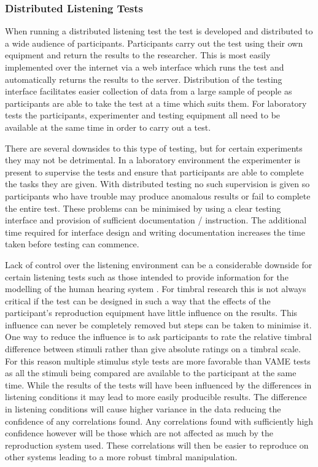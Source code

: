 		\subsubsection*{Distributed Listening Tests}
			When running a distributed listening test the test is developed and distributed to a wide audience
			of participants. Participants carry out the test using their own equipment and return the results
			to the researcher. This is most easily implemented over the internet via a web interface which runs
			the test and automatically returns the results to the server. Distribution of the testing interface
			facilitates easier collection of data from a large sample of people as participants are able to
			take the test at a time which suits them. For laboratory tests the participants, experimenter and
			testing equipment all need to be available at the same time in order to carry out a test.

			There are several downsides to this type of testing, but for certain experiments they may not be
			detrimental. In a laboratory environment the experimenter is present to supervise the tests and
			ensure that participants are able to complete the tasks they are given.  With distributed testing
			no such supervision is given so participants who have trouble may produce anomalous results or
			fail to complete the entire test. These problems can be minimised by using a clear testing
			interface and provision of sufficient documentation / instruction. The additional time required for
			interface design and writing documentation increases the time taken before testing can commence.

			Lack of control over the listening environment can be a considerable downside for certain listening
			tests such as those intended to provide information for the modelling of the human hearing system
			\citep{moore1990auditory}. For timbral research this is not always critical if the test can be
			designed in such a way that the effects of the participant's reproduction equipment have little
			influence on the results. This influence can never be completely removed but steps can be taken to
			minimise it.  One way to reduce the influence is to ask participants to rate the relative timbral
			difference between stimuli rather than give absolute ratings on a timbral scale. For this reason
			multiple stimulus style tests are more favorable than VAME tests as all the stimuli being compared
			are available to the participant at the same time. While the results of the tests will have been
			influenced by the differences in listening conditions it may lead to more easily producible
			results. The difference in listening conditions will cause higher variance in the data reducing the
			confidence of any correlations found. Any correlations found with sufficiently high confidence
			however will be those which are not affected as much by the reproduction system used.  These
			correlations will then be easier to reproduce on other systems leading to a more robust timbral
			manipulation.

